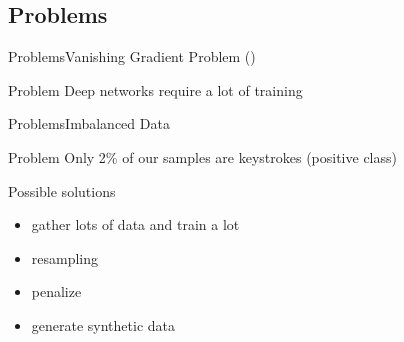 \subsection{Problems}
\begin{frame}{Problems}{Vanishing Gradient Problem (\citet{hochreiter-vanishing-gradient})}
    \vfill\null
    \begin{block}{Problem}
        Deep networks require a lot of training
    \end{block}
    \vfill\null
\end{frame}
\begin{frame}{Problems}{Imbalanced Data}
    \vfill\null
    \begin{block}{Problem}
        Only 2\% of our samples are keystrokes (positive class)
    \end{block}
    \pause
    \vfill\null
    \begin{block}{Possible solutions \citep{web:combat-imbalanced-dataset}}
        \begin{itemize}
            \item gather lots of data and train a lot
            \item resampling
            \item penalize
            \item generate synthetic data
        \end{itemize}
    \end{block}
    \vfill\null

\end{frame}

